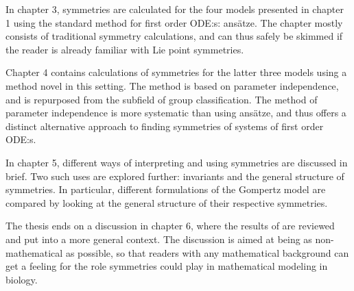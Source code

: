 In chapter 3, symmetries are calculated for the four models presented in chapter 1 using the standard method for first order ODE:s: ansätze.
The chapter mostly consists of traditional symmetry calculations, and can thus safely be skimmed if the reader is already familiar with Lie point symmetries.

Chapter 4 contains calculations of symmetries for the latter three models using a method novel in this setting.
The method is based on parameter independence, and is repurposed from the subfield of group classification.
The method of parameter independence is more systematic than using ansätze, and thus offers a distinct alternative approach to finding symmetries of systems of first order ODE:s.

In chapter 5, different ways of interpreting and using symmetries are discussed in brief.
Two such uses are explored further: invariants and the general structure of symmetries.
In particular, different formulations of the Gompertz model are compared by looking at the general structure of their respective symmetries.

The thesis ends on a discussion in chapter 6, where the results of are reviewed and put into a more general context.
The discussion is aimed at being as non-mathematical as possible, so that readers with any mathematical background can get a feeling for the role symmetries could play in mathematical modeling in biology.
